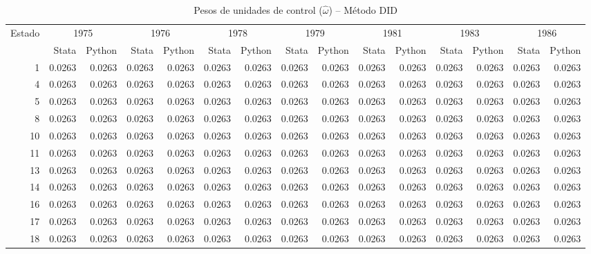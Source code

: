 \begin{table}[H]
\centering
\caption{Pesos de unidades de control ($\hat{\omega}$) -- M\'etodo DID}
\label{tab:omega_did}
\footnotesize
\begin{tabular}{rrrrrrrrrrrrrrr}
\toprule
Estado & \multicolumn{2}{c}{1975} & \multicolumn{2}{c}{1976} & \multicolumn{2}{c}{1978} & \multicolumn{2}{c}{1979} & \multicolumn{2}{c}{1981} & \multicolumn{2}{c}{1983} & \multicolumn{2}{c}{1986} \\
 & \scriptsize Stata & \scriptsize Python & \scriptsize Stata & \scriptsize Python & \scriptsize Stata & \scriptsize Python & \scriptsize Stata & \scriptsize Python & \scriptsize Stata & \scriptsize Python & \scriptsize Stata & \scriptsize Python & \scriptsize Stata & \scriptsize Python \\
\midrule
1 & 0.0263 & 0.0263 & 0.0263 & 0.0263 & 0.0263 & 0.0263 & 0.0263 & 0.0263 & 0.0263 & 0.0263 & 0.0263 & 0.0263 & 0.0263 & 0.0263 \\
4 & 0.0263 & 0.0263 & 0.0263 & 0.0263 & 0.0263 & 0.0263 & 0.0263 & 0.0263 & 0.0263 & 0.0263 & 0.0263 & 0.0263 & 0.0263 & 0.0263 \\
5 & 0.0263 & 0.0263 & 0.0263 & 0.0263 & 0.0263 & 0.0263 & 0.0263 & 0.0263 & 0.0263 & 0.0263 & 0.0263 & 0.0263 & 0.0263 & 0.0263 \\
8 & 0.0263 & 0.0263 & 0.0263 & 0.0263 & 0.0263 & 0.0263 & 0.0263 & 0.0263 & 0.0263 & 0.0263 & 0.0263 & 0.0263 & 0.0263 & 0.0263 \\
10 & 0.0263 & 0.0263 & 0.0263 & 0.0263 & 0.0263 & 0.0263 & 0.0263 & 0.0263 & 0.0263 & 0.0263 & 0.0263 & 0.0263 & 0.0263 & 0.0263 \\
11 & 0.0263 & 0.0263 & 0.0263 & 0.0263 & 0.0263 & 0.0263 & 0.0263 & 0.0263 & 0.0263 & 0.0263 & 0.0263 & 0.0263 & 0.0263 & 0.0263 \\
13 & 0.0263 & 0.0263 & 0.0263 & 0.0263 & 0.0263 & 0.0263 & 0.0263 & 0.0263 & 0.0263 & 0.0263 & 0.0263 & 0.0263 & 0.0263 & 0.0263 \\
14 & 0.0263 & 0.0263 & 0.0263 & 0.0263 & 0.0263 & 0.0263 & 0.0263 & 0.0263 & 0.0263 & 0.0263 & 0.0263 & 0.0263 & 0.0263 & 0.0263 \\
16 & 0.0263 & 0.0263 & 0.0263 & 0.0263 & 0.0263 & 0.0263 & 0.0263 & 0.0263 & 0.0263 & 0.0263 & 0.0263 & 0.0263 & 0.0263 & 0.0263 \\
17 & 0.0263 & 0.0263 & 0.0263 & 0.0263 & 0.0263 & 0.0263 & 0.0263 & 0.0263 & 0.0263 & 0.0263 & 0.0263 & 0.0263 & 0.0263 & 0.0263 \\
18 & 0.0263 & 0.0263 & 0.0263 & 0.0263 & 0.0263 & 0.0263 & 0.0263 & 0.0263 & 0.0263 & 0.0263 & 0.0263 & 0.0263 & 0.0263 & 0.0263 \\

\end{tabular}
\end{table}
